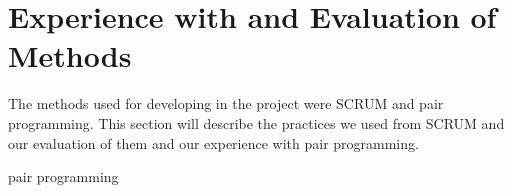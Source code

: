 \section{Experience with and Evaluation of Methods}
The methods used for developing in the project were SCRUM and pair programming. This section will describe the practices we used from SCRUM and our evaluation of them and our experience with pair programming.


pair programming


